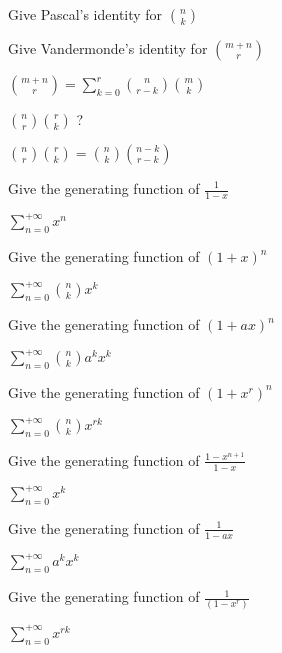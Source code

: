 \documentclass[12pt]{article}
\newcommand*{\xfield}[1]{\begin{mdframed}\centering #1\end{mdframed}\bigskip}
\newenvironment{note}{}{}
\begin{document}
\begin{note}
	\xfield{Give Pascal's identity for $\binom{n}{k}$}
	\xfield{$\binom{n}{k} = \binom{n-1}{k} + \binom{n-1}{k-1}$
	\item  
	\item 
	\end{itemize} }
\end{note}

\begin{note}
	\xfield{Give Vandermonde's identity for $\binom{m+n}{r}$}
	\xfield{$\binom{m+n}{r} = \sum\limits^{r}_{k=0} \binom{n}{r-k}\binom{m}{k}$}
\end{note}
\begin{note}
	\xfield{$\binom{n}{r}\binom{r}{k}$ ?}
	\xfield{$\binom{n}{r}\binom{r}{k}=\binom{n}{k}\binom{n-k}{r-k}$}
\end{note}

\begin{note}
	\xfield{Give the generating function of $\frac{1}{1-x}$}
	\xfield{$\sum\limits_{n=0}^{+{\infty}}{x^n}$}
\end{note}

\begin{note}
	\xfield{Give the generating function of $(1+x)^n$}
	\xfield{$\sum\limits_{n=0}^{+{\infty}}{\binom{n}{k}x^k}$}
\end{note}

\begin{note}
	\xfield{Give the generating function of $(1+ax)^n$}
	\xfield{$\sum\limits_{n=0}^{+{\infty}}{\binom{n}{k}a^kx^k}$}
\end{note}

\begin{note}
	\xfield{Give the generating function of $(1+x^r)^n$}
	\xfield{$\sum\limits_{n=0}^{+{\infty}}{\binom{n}{k}x^{rk}}$}
\end{note}

\begin{note}
	\xfield{Give the generating function of $\frac{1-x^{n+1}}{1-x}$}
	\xfield{$\sum\limits_{n=0}^{+{\infty}}{x^k}$}
\end{note}

\begin{note}
	\xfield{Give the generating function of $\frac{1}{1-ax}$}
	\xfield{$\sum\limits_{n=0}^{+{\infty}}{a^kx^k}$}
\end{note}

\begin{note}
	\xfield{Give the generating function of $\frac{1}{(1-x^r)}$}
	\xfield{$\sum\limits_{n=0}^{+{\infty}}{x^{rk}}$}
\end{note}
\end{document}

